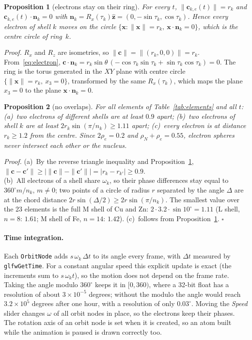 \documentclass[a4paper, 11pt]{article}
\newtheorem{proposition}{{\bf Proposition}}
\newcommand{\code}[1]{\texttt{#1}}
\begin{document}
\begin{proposition}[electrons stay on their ring]\label{prop:onring}
For every $t$, $\|\mathbf c_{k,e}(t)\|=r_k$ and $\mathbf c_{k,e}(t)\cdot\mathbf n_k=0$ with $\mathbf n_k=R_x(\tau_k)\hat{\mathbf z}=(0,-\sin\tau_k,\cos\tau_k)$.
Hence every electron of shell $k$ moves on the circle $\{\mathbf x:\|\mathbf x\|=r_k,\ \mathbf x\cdot\mathbf n_k=0\}$, which is the centre circle of ring~$k$.
\end{proposition}
\noindent\textit{Proof.} $R_x$ and $R_z$ are isometries, so $\|\mathbf c\|=\|(r_k,0,0)\|=r_k$. From~\eqref{eq:electron},
$\mathbf c\cdot\mathbf n_k=r_k\sin\theta\,(-\cos\tau_k\sin\tau_k+\sin\tau_k\cos\tau_k)=0$. The ring is the torus generated in the $XY$ plane with
centre circle $\{\|\mathbf x\|=r_k,\ x_3=0\}$, transformed by the same $R_x(\tau_k)$, which maps the plane $x_3=0$ to the plane $\mathbf x\cdot\mathbf n_k=0$. 

\begin{proposition}[no overlaps]\label{prop:nooverlap}
For all elements of Table~\ref{tab:elements} and all $t$: (a)~two electrons of different shells are at least $0.9$ apart;
(b)~two electrons of shell $k$ are at least $2r_k\sin(\pi/n_k)\ge1.11$ apart; (c)~every electron is at distance $r_k\ge1.2$ from the
centre. Since $2\rho_e=0.2$ and $\rho_N+\rho_e=0.55$, electron spheres never intersect each other or the nucleus.
\end{proposition}
\noindent\textit{Proof.} (a)~By the reverse triangle inequality and Proposition~\ref{prop:onring},
$\|\mathbf c-\mathbf c'\|\ge\bigl|\|\mathbf c\|-\|\mathbf c'\|\bigr|=|r_k-r_{k'}|\ge0.9$. \\
(b)~All electrons of a shell share $\omega_k$, so their phase differences stay equal to $360^\circ m/n_k$, $m\ne0$; two points of a circle of radius
$r$ separated by the angle $\Delta$ are at the chord distance $2r\sin(\Delta/2)\ge2r\sin(\pi/n_k)$. The smallest value over the 23 elements is
the full M shell of Cu and Zn: $2\cdot3.2\cdot\sin10^\circ=1.11$ (L shell, $n=8$: $1.61$; M shell of Fe, $n=14$: $1.42$). (c)~follows from
Proposition~\ref{prop:onring}. \hfill$\square$

\paragraph{Time integration.} Each \code{OrbitNode} adds $s\,\omega_k\,\Delta t$ to its angle every frame, with $\Delta t$ measured by
\code{glfwGetTime}. For a constant angular speed this explicit update is exact (the increments sum to $s\,\omega_k t$), so the motion does not
depend on the frame rate. Taking the angle modulo $360^\circ$ keeps it in $[0,360)$, where a 32-bit float has a resolution of about
$3\times10^{-5}$ degrees; without the modulo the angle would reach $3.2\times10^5$ degrees after one hour, with a resolution of only $0.03^\circ$.
Moving the \emph{Speed} slider changes $\omega$ of all orbit nodes in place, so the electrons keep their phases. The rotation axis of an
orbit node is set when it is created, so an atom built while the animation is paused is drawn correctly too.
\end{document}

